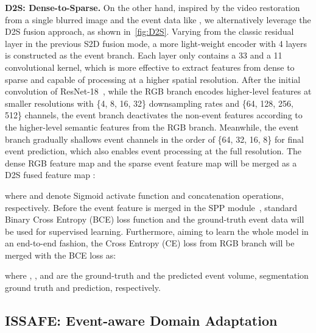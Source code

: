 \documentclass[letterpaper, 10 pt, conference]{ieeeconf}
\begin{document}
\textbf{D2S: Dense-to-Sparse.} On the other hand, inspired by the video restoration from a single blurred image and the event data like \cite{pan2019video_from_event, jin2018video_from_blurred_image}, we alternatively leverage the D2S fusion approach, as shown in~\cref{fig:D2S}. Varying from the classic residual layer in the previous S2D fusion mode, a more light-weight encoder with 4 layers is constructed as the event branch. 
Each layer only contains a 33 and a 11 convolutional kernel, which is more effective to extract features from dense to sparse and capable of processing at a higher spatial resolution. After the initial convolution of ResNet-18~\cite{he2016resnet}, while the RGB branch encodes higher-level features at smaller resolutions with \{4, 8, 16, 32\} downsampling rates and \{64, 128, 256, 512\} channels, the event branch deactivates the non-event features according to the higher-level semantic features from the RGB branch. Meanwhile, the event branch gradually shallows event channels in the order of \{64, 32, 16, 8\} for final event prediction, which also enables event processing at the full resolution. 
The dense RGB feature map  and the sparse event feature map  will be merged as a D2S fused feature map :

where  and  denote Sigmoid activate function and concatenation operations, respectively. 
Before the event feature is merged in the SPP module~\cite{zhao2017PSPNet}, standard Binary Cross Entropy (BCE) loss function and the ground-truth event data will be used for supervised learning. 
Furthermore, aiming to learn the whole model in an end-to-end fashion, the Cross Entropy (CE) loss from RGB branch will be merged with the BCE loss as:

where , ,  and  are the ground-truth and the predicted event volume, segmentation ground truth and prediction, respectively. 

\subsection{ISSAFE: Event-aware Domain Adaptation}

\end{document}
